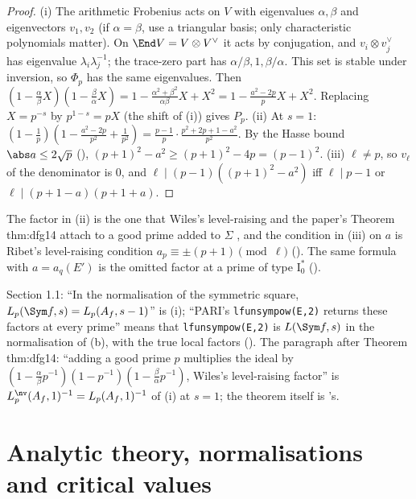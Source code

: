 \begin{proof}
(i) The arithmetic Frobenius acts on $V$ with eigenvalues $\alpha,\beta$ and eigenvectors $v_1,v_2$ (if $\alpha=\beta$, use a triangular basis; only characteristic
polynomials matter). On $\End V=V\otimes V^\vee$ it acts by conjugation, and $v_i\otimes v_j^\vee$ has eigenvalue $\lambda_i\lambda_j^{-1}$; the trace-zero part has
$\alpha/\beta,1,\beta/\alpha$. This set is stable under inversion, so $\Phi_p$ has the same eigenvalues. Then
$(1-\frac\alpha\beta X)(1-\frac\beta\alpha X)=1-\frac{\alpha^2+\beta^2}{\alpha\beta}X+X^2=1-\frac{a^2-2p}pX+X^2$. Replacing $X=p^{-s}$ by $p^{1-s}=pX$ (the shift of
(i)) gives $P_p$.
(ii) At $s=1$: $(1-\frac1p)(1-\frac{a^2-2p}{p^2}+\frac1{p^2})=\frac{p-1}p\cdot\frac{p^2+2p+1-a^2}{p^2}$. By the Hasse bound $\abs a\le2\sqrt p$ (),
$(p+1)^2-a^2\ge(p+1)^2-4p=(p-1)^2$.
(iii) $\ell\ne p$, so $v_\ell$ of the denominator is $0$, and $\ell\mid(p-1)((p+1)^2-a^2)$ iff $\ell\mid p-1$ or $\ell\mid(p+1-a)(p+1+a)$.
\end{proof}

The factor in (ii) is the one that Wiles's level-raising and the paper's Theorem thm:dfg14 attach to a good prime added to $\Sigma$ \cite{DDT}, and the
condition in (iii) on $a$ is Ribet's level-raising condition $a_p\equiv\pm(p+1)\pmod\ell$ (). The same formula with $a=a_q(E')$ is the omitted factor at a
prime of type $\mathrm I_0^*$ ().

\begin{paperlink}
Section 1.1: ``In the normalisation of the symmetric square, $L_p(\Sym f,s)=L_p(A_f,s-1)$'' is (i); ``PARI's \texttt{lfunsympow(E,2)}
returns these factors at every prime'' means that \texttt{lfunsympow(E,2)} is $L(\Sym f,s)$ in the normalisation of (b), with the true
local factors (). The paragraph after Theorem thm:dfg14: ``adding a good prime $p$ multiplies the ideal by
$(1-\frac\alpha\beta p^{-1})(1-p^{-1})(1-\frac\beta\alpha p^{-1})$, Wiles's level-raising factor'' is $L_p^{\nv}(A_f,1)^{-1}=L_p(A_f,1)^{-1}$ of
(i) at $s=1$; the theorem itself is 's.
\end{paperlink}

\section{Analytic theory, normalisations and critical values}\label{sec:lfunctions:analytic}

